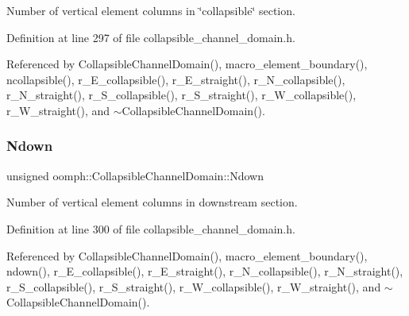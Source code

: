 Number of vertical element columns in \char`\"{}collapsible\char`\"{} section. 



Definition at line 297 of file collapsible\+\_\+channel\+\_\+domain.\+h.



Referenced by Collapsible\+Channel\+Domain(), macro\+\_\+element\+\_\+boundary(), ncollapsible(), r\+\_\+\+E\+\_\+collapsible(), r\+\_\+\+E\+\_\+straight(), r\+\_\+\+N\+\_\+collapsible(), r\+\_\+\+N\+\_\+straight(), r\+\_\+\+S\+\_\+collapsible(), r\+\_\+\+S\+\_\+straight(), r\+\_\+\+W\+\_\+collapsible(), r\+\_\+\+W\+\_\+straight(), and $\sim$\+Collapsible\+Channel\+Domain().

\mbox{\label{classoomph_1_1CollapsibleChannelDomain_a1f9c92507803d56e12cf5cb24b11cd83}} 
\subsubsection{\texorpdfstring{Ndown}{Ndown}}
{\footnotesize\ttfamily unsigned oomph\+::\+Collapsible\+Channel\+Domain\+::\+Ndown\hspace{0.3cm}{\ttfamily [private]}}



Number of vertical element columns in downstream section. 



Definition at line 300 of file collapsible\+\_\+channel\+\_\+domain.\+h.



Referenced by Collapsible\+Channel\+Domain(), macro\+\_\+element\+\_\+boundary(), ndown(), r\+\_\+\+E\+\_\+collapsible(), r\+\_\+\+E\+\_\+straight(), r\+\_\+\+N\+\_\+collapsible(), r\+\_\+\+N\+\_\+straight(), r\+\_\+\+S\+\_\+collapsible(), r\+\_\+\+S\+\_\+straight(), r\+\_\+\+W\+\_\+collapsible(), r\+\_\+\+W\+\_\+straight(), and $\sim$\+Collapsible\+Channel\+Domain().

\mbox{\label{classoomph_1_1CollapsibleChannelDomain_a16bef61c4223f92cb1b0c35e9a7ea7d2}} 

